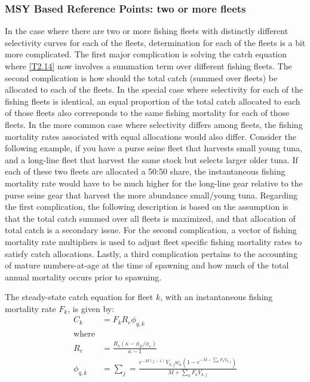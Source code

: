 

\subsubsection{MSY Based Reference Points: two or more fleets} %
\label{ssub:msy_based_reference_points_two_or_more_fleets}

In the case where there are two or more fishing fleets with distinctly different selectivity curves for each of the fleets, determination \fmsy for each of the fleets is a bit more complicated.  The first major complication is solving the catch equation where \eqref{T2.14} now involves a summation term over different fishing fleets.  The second complication is how should the total catch (summed over fleets) be allocated to each of the fleets.  In the special case where selectivity for each of the fishing fleets is identical, an equal proportion of the total catch allocated to each of those fleets also corresponds to the same fishing mortality for each of those fleets.  In the more common case where selectivity differs among fleets, the fishing mortality rates associated with equal allocations would also differ.  Consider the following example, if you have a purse seine fleet that harvests small young tuna, and a long-line fleet that harvest the same stock but selects larger older tuna. If each of these two fleets are allocated a 50:50 share, the instantaneous fishing mortality rate would have to be much higher for the long-line gear relative to the purse seine gear that harvest the more abundance small/young tuna.  Regarding the first complication, the following description is based on the assumption is that the total catch summed over all fleets is maximized, and that allocation of total catch is a secondary issue. For the second complication, a vector of fishing mortality rate multipliers is used to adjust fleet specific fishing mortality rates to satisfy catch allocations.  Lastly, a third complication pertains to the accounting of mature numbers-at-age at the time of spawning and how much of the total annual mortality occurs prior to spawning. 


The steady-state catch equation for fleet $k$, with an instantaneous fishing mortality rate $F_k$, is given by:
\begin{align}
	C_{k} &= F_k R_e \phi_{q,k} \label{eq:C_k}\\
	\mbox{where}\nonumber\\
	R_e &= \frac{R_o (\kappa-\phi_E/\phi_e)}{\kappa-1} \label{eq:R_e}\\  %
	\phi_{q,k} &= \sum_j = \frac{e^{-M(j-1)}V_{k,j}w_a (1-e^{-M-\sum_k F_k V_{k,j} })}{M+\sum_k F_k V_{k,j}} \label{eq:phi_qk}
\end{align}

